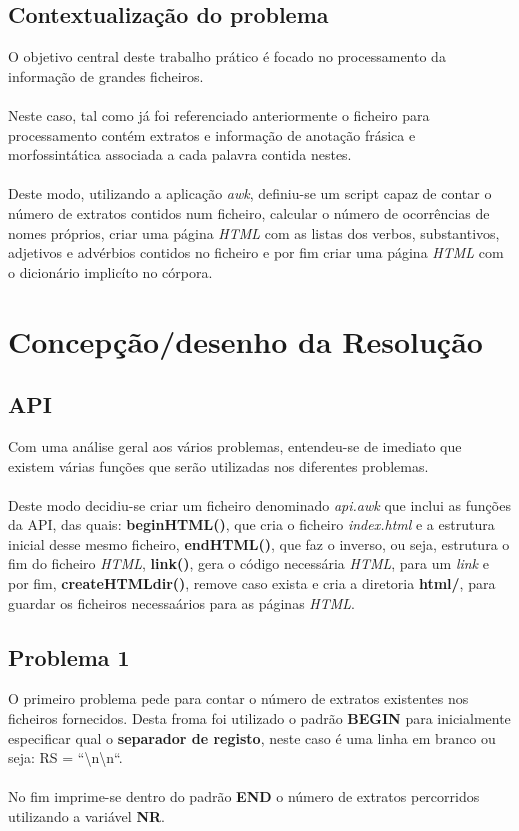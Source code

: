 \documentclass[11pt,a4paper]{report}%
\begin{document}
\section{Contextualização do problema} \label{sec:descricaoProblema} %
O objetivo central deste trabalho prático é focado no processamento da informação de grandes ficheiros.\\\\Neste caso, tal como já foi referenciado anteriormente o ficheiro para processamento contém extratos e informação de anotação frásica e morfossintática associada a cada palavra contida nestes.\\\\Deste modo, utilizando a aplicação \emph{awk}, definiu-se um script capaz de contar o número de extratos contidos num ficheiro, calcular o número de ocorrências de nomes próprios, criar uma página \emph{HTML} com as listas dos verbos, substantivos, adjetivos e advérbios contidos no ficheiro e por fim criar uma página \emph{HTML} com o dicionário implicíto no córpora.


\chapter{Concepção/desenho da Resolução}

\section{API}
Com uma análise geral aos vários problemas, entendeu-se de imediato que existem várias funções que serão utilizadas nos diferentes problemas. \\\\Deste modo decidiu-se criar um ficheiro denominado \emph{api.awk} que inclui as funções da API, das quais: \textbf{beginHTML()}, que cria o ficheiro \emph{index.html} e a estrutura inicial desse mesmo ficheiro, \textbf{endHTML()}, que faz o inverso, ou seja, estrutura o fim do ficheiro \emph{HTML}, \textbf{link()}, gera o código necessária \emph{HTML}, para um \emph{link} e por fim, \textbf{createHTMLdir()}, remove caso exista e cria a diretoria \textbf{html/}, para guardar os ficheiros necessaários para as páginas \emph{HTML}. 
\newpage
\section{Problema 1}
O primeiro problema pede para contar o número de extratos existentes nos ficheiros fornecidos. Desta froma foi utilizado o padrão \textbf{BEGIN} para inicialmente especificar qual o \textbf{separador de registo}, neste caso é uma linha em branco ou seja: RS = ``\textbackslash n\textbackslash n``.
\\\\
No fim imprime-se dentro do padrão \textbf{END} o número de extratos percorridos utilizando a variável \textbf{NR}. 
\newpage
\end{document}
